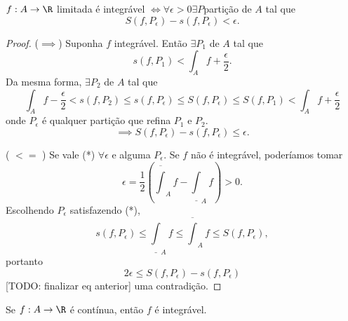 \begin{prop}
    $f:A\to \R$ limitada é integrável $\iff \forall \epsilon>0 \exists P $partição de $A$ tal que  \[
    S\left( f, P_\epsilon \right) - s\left( f,P_\epsilon \right) <\epsilon \tag{*}
    .\] 
\end{prop}
\begin{proof}
    ($\implies$) Suponha $f$ integrável. Então $\exists P_1$ de $A$ tal que \[
    s\left( f, P_1 \right) < \int_A f + \frac{\epsilon}{2}
    .\] Da mesma forma, $\exists P_2$ de $A$ tal que \[
    \int_A f - \frac{\epsilon}{2} < s\left( f, P_2 \right) \le s\left( f,P_\epsilon \right) \le S\left( f,P_\epsilon \right) \le S\left( f,P_1 \right) <\int_A f + \frac{\epsilon}{2}
    \] onde $P_\epsilon$ é qualquer partição que refina $P_1$ e $P_2$. \[
    \implies S\left( f, P_\epsilon \right) - s\left( f, P_\epsilon \right) \le \epsilon
    .\] 

    ( $ < =$ ) Se vale (*) $\forall \epsilon$ e alguma $P_\epsilon$. Se  $f$ não é integrável, poderíamos tomar \[
	\epsilon = \frac{1}{2}\left( \overline{\int}_A f - \underline{\int}_A f \right) > 0
    .\] Escolhendo $P_\epsilon$ satisfazendo (*), \[
    s\left( f, P_\epsilon \right) \le \underline{\int}_A f \le \overline{\int}_A f\le S\left( f, P_\epsilon \right) 
    ,\] portanto \[
    2\epsilon \le S\left( f, P_\epsilon \right) - s\left( f, P_\epsilon \right) 
\] [TODO: finalizar eq anterior] uma contradição.
\end{proof}
\begin{corollary}
    Se $f:A\to \R$ é contínua, então $f$ é integrável.
\end{corollary}
